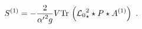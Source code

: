 \begin{equation}
S^{\left( 1\right) }=-\frac{2}{{\alpha ^{\prime }}^2g}
V\mbox{Tr}\,\left( {%
\mathcal{L}_{0}}_{\star }^{2}\star P\star A^{\left( 1\right) }\right) \,\,.
\end{equation}%
